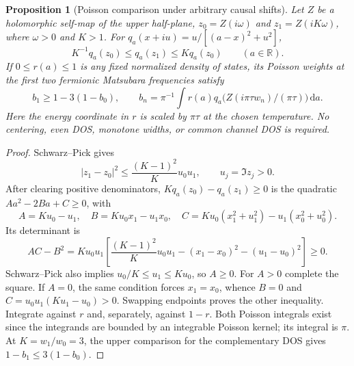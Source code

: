 \documentclass[11pt]{article}
\newtheorem{proposition}[theorem]{Proposition}
\newcommand{\dd}{\,\mathrm{d}}
\begin{document}
\begin{proposition}[Poisson comparison under arbitrary causal shifts]\label{prop:harnack}
Let $Z$ be a holomorphic self-map of the upper half-plane, $z_0=Z(i\omega)$ and $z_1=Z(iK\omega)$, where $\omega>0$ and $K>1$. For $q_a(x+iu)=u/[(a-x)^2+u^2]$,
\[
 K^{-1}q_a(z_0)\le q_a(z_1)\le Kq_a(z_0)\qquad(a\in\mathbb R).
\]
If $0\le r(a)\le1$ is any fixed normalized density of states, its Poisson weights at the first two fermionic Matsubara frequencies satisfy
\[
 b_1\ge1-3(1-b_0),\qquad
 b_n=\pi^{-1}\int r(a)q_a\bigl(Z(i\pi\tau w_n)/(\pi\tau)\bigr)\dd a.
\]
Here the energy coordinate in $r$ is scaled by $\pi\tau$ at the chosen temperature. No centering, even DOS, monotone widths, or common channel DOS is required.
\end{proposition}
\begin{proof}
Schwarz--Pick gives
\[
 |z_1-z_0|^2\le\frac{(K-1)^2}{K}u_0u_1,\qquad u_j=\Im z_j>0.
\]
After clearing positive denominators, $Kq_a(z_0)-q_a(z_1)\ge0$ is the quadratic $Aa^2-2Ba+C\ge0$, with
\[
 A=Ku_0-u_1,\quad B=Ku_0x_1-u_1x_0,\quad
 C=Ku_0(x_1^2+u_1^2)-u_1(x_0^2+u_0^2).
\]
Its determinant is
\[
 AC-B^2=Ku_0u_1\left[\frac{(K-1)^2}{K}u_0u_1-(x_1-x_0)^2-(u_1-u_0)^2\right]\ge0.
\]
Schwarz--Pick also implies $u_0/K\le u_1\le Ku_0$, so $A\ge0$. For $A>0$ complete the square. If $A=0$, the same condition forces $x_1=x_0$, whence $B=0$ and $C=u_0u_1(Ku_1-u_0)>0$. Swapping endpoints proves the other inequality. Integrate against $r$ and, separately, against $1-r$. Both Poisson integrals exist since the integrands are bounded by an integrable Poisson kernel; its integral is $\pi$. At $K=w_1/w_0=3$, the upper comparison for the complementary DOS gives $1-b_1\le3(1-b_0)$.
\end{proof}
\end{document}
